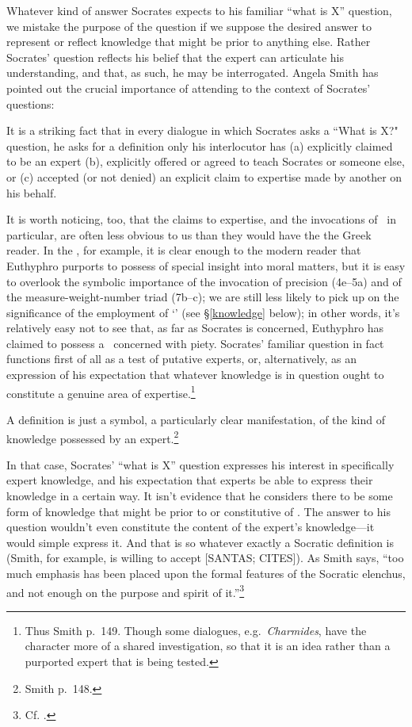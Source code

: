 \documentclass[11pt,letterpaper,oneside]{amsart} %
\begin{document}
Whatever kind of answer Socrates expects to his familiar ``what is X'' question, we mistake the purpose of the question if we suppose the desired answer to represent or reflect knowledge that might be prior to anything else. Rather Socrates' question reflects his belief that the expert can articulate his understanding, and that, as such, he may be interrogated. Angela Smith has pointed out the crucial importance of attending to the context of Socrates' questions:\begin{squote}It is a striking fact that in every dialogue in which Socrates asks a ``What is X?" question, he asks for a definition only  his interlocutor has (a) explicitly claimed to be an expert (b), explicitly offered or agreed to teach Socrates or someone else, or (c) accepted (or not denied) an explicit claim to expertise made by another on his behalf.\end{squote} It is worth noticing, too, that the claims to expertise, and the invocations of \techne\ in particular, are often less obvious to us than they would have the the Greek reader. In the , for example, it is clear enough to the modern reader that Euthyphro purports to possess  of special insight into moral matters, but it is easy to overlook the symbolic importance of the invocation of precision (4e--5a) and of the measure-weight-number triad (7b--c); we are still less likely to pick up on the significance of the employment of `\epistasthai' (see \S\ref{knowledge} below); in other words, it's relatively easy not to see that, as far as Socrates is concerned, Euthyphro has claimed to possess a \techne\ concerned with piety. Socrates' familiar question in fact functions first of all as a test of putative experts, or, alternatively, as an expression of his expectation that whatever knowledge is in question ought to constitute a genuine area of expertise.\footnote{Thus Smith p.\ 149. Though some dialogues, e.g.\ \emph{Charmides}, have the character more of a shared investigation, so that it is an idea rather than a purported expert that is being tested.}\begin{squote}A definition is just a symbol, a particularly clear manifestation, of the kind of knowledge possessed by an expert.\footnote{Smith p.\ 148.}\end{squote} 




In that case, Socrates' ``what is X'' question expresses his interest in specifically expert knowledge, and his expectation that experts be able to express their knowledge in a certain way. It isn't evidence that he considers there to be some form of knowledge that might be prior to or constitutive of \techne. The answer to his question wouldn't even constitute the content of the expert's knowledge---it would simple express it. And that is so whatever exactly a Socratic definition is (Smith, for example, is willing to accept [SANTAS; CITES]). As Smith says, ``too much emphasis has been placed upon the formal features of the Socratic elenchus, and not enough on the purpose and spirit of it.''\footnote{Cf. \citet[153]{asmith1998}.}
\end{document}

